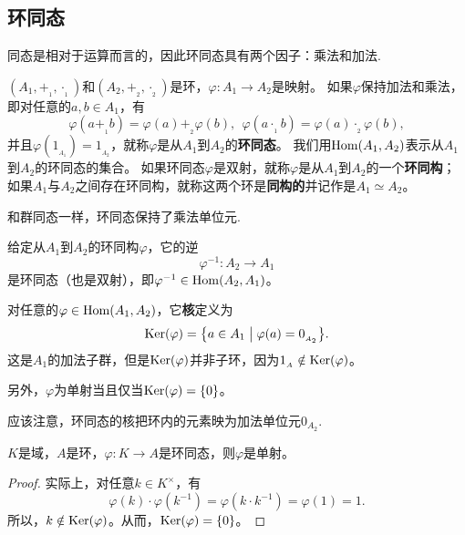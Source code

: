 \documentclass[lang=cn,10pt]{elegantbook}
\begin{document}
	\subsection{环同态}
	同态是相对于运算而言的，因此环同态具有两个因子：乘法和加法.
	\begin{definition}[环同态]
		$(A_1,+_{_1},\cdot_{_1})$和$(A_2,+_{_2},\cdot_{_2})$是环，$\varphi\colon A_1\rightarrow A_2$是映射。
		如果$\varphi$保持加法和乘法，即对任意的$a,b\in A_1$，有
		\[\varphi(a +_{_1} b)=\varphi(a)+_{_2} \varphi(b), \ \ \varphi(a \cdot_{_1} b)=\varphi(a)\cdot_{_2} \varphi(b),\]
		并且$\varphi(1_{_{A_1}})=1_{_{A_2}}$，就称$\varphi$是从$A_1$到$A_2$的{\bf 环同态}。
		我们用${\rm Hom}(A_1,A_2)$表示从$A_1$到$A_2$的环同态的集合。
		如果环同态$\varphi$是双射，就称$\varphi$是从$A_1$到$A_2$的一个{\bf 环同构}；
		如果$A_1$与$A_2$之间存在环同构，就称这两个环是{\bf 同构的}并记作是$A_1\simeq A_2$。
	\end{definition}
	\begin{note}
		和群同态一样，环同态保持了乘法单位元.
		
			给定从$A_1$到$A_2$的环同构$\varphi$，它的逆
			\[\varphi^{-1}\colon A_2\longrightarrow A_1\]
			是环同态（也是双射），即$\varphi^{-1}\in {\rm Hom}(A_2,A_1)$。
	\end{note}
	\begin{definition}[核]
		对任意的$\varphi\in {\rm Hom}(A_1,A_2)$，它{\bf 核}定义为
		\[{\rm Ker}(\varphi)=\big\{a\in A_1\bigm|\varphi(a)=0_{_{A_2}}\big\}.\]
		这是$A_1$的加法子群，但是${\rm Ker}(\varphi)$并非子环，因为$1_{_A}\notin {\rm Ker}(\varphi)$。
		
		另外，$\varphi$为单射当且仅当${\rm Ker}(\varphi)=\{0\}$。
	\end{definition}
	\begin{note}
		应该注意，环同态的核把环内的元素映为加法单位元\(0_{A_2}\).
	\end{note}
	\begin{lemma}
		$K$是域，$A$是环，$\varphi\colon K\rightarrow A$是环同态，则$\varphi$是单射。
	\end{lemma}
	\begin{proof}
		实际上，对任意$k\in K^\times$，有
		\[\varphi(k)\cdot \varphi(k^{-1})=\varphi(k \cdot k^{-1})=\varphi(1)=1.\]
		所以，$k\notin {\rm Ker}(\varphi)$。从而，${\rm Ker}(\varphi)=\{0\}$。
	\end{proof}
	
\end{document}
